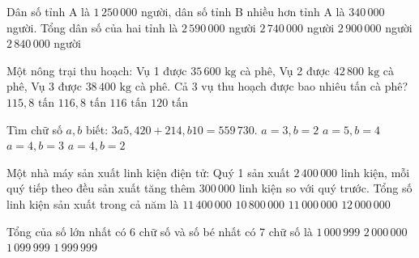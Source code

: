 \begin{ex} %
Dân số tỉnh A là $1\,250\,000$ người, dân số tỉnh B nhiều hơn tỉnh A là $340\,000$ người. Tổng dân số của hai tỉnh là
\choice
{$2\,590\,000$ người}
{$2\,740\,000$ người}
{$2\,900\,000$ người}
{\True $2\,840\,000$ người}
\end{ex}

\begin{ex} %
Một nông trại thu hoạch: Vụ 1 được $35\,600\text{ kg}$ cà phê, Vụ 2 được $42\,800\text{ kg}$ cà phê, Vụ 3 được $38\,400\text{ kg}$ cà phê. Cả 3 vụ thu hoạch được bao nhiêu tấn cà phê?
\choice
{$115{,}8\text{ tấn}$}
{\True $116{,}8\text{ tấn}$}
{$116\text{ tấn}$}
{$120\text{ tấn}$}
\end{ex}

\begin{ex} %
Tìm chữ số $a, b$ biết: $3a5,420 + 214,b10 = 559\,730$.
\choice
{$a = 3, b = 2$}
{$a = 5, b = 4$}
{\True $a = 4, b = 3$}
{$a = 4, b = 2$}
\end{ex}

\begin{ex} %
Một nhà máy sản xuất linh kiện điện tử: Quý 1 sản xuất $2\,400\,000$ linh kiện, mỗi quý tiếp theo đều sản xuất tăng thêm $300\,000$ linh kiện so với quý trước. Tổng số linh kiện sản xuất trong cả năm là
\choice
{\True $11\,400\,000$}
{$10\,800\,000$}
{$11\,000\,000$}
{$12\,000\,000$}
\end{ex}

\begin{ex} %
Tổng của số lớn nhất có 6 chữ số và số bé nhất có 7 chữ số là
\choice
{$1\,000\,999$}
{$2\,000\,000$}
{$1\,099\,999$}
{\True $1\,999\,999$}
\end{ex}

